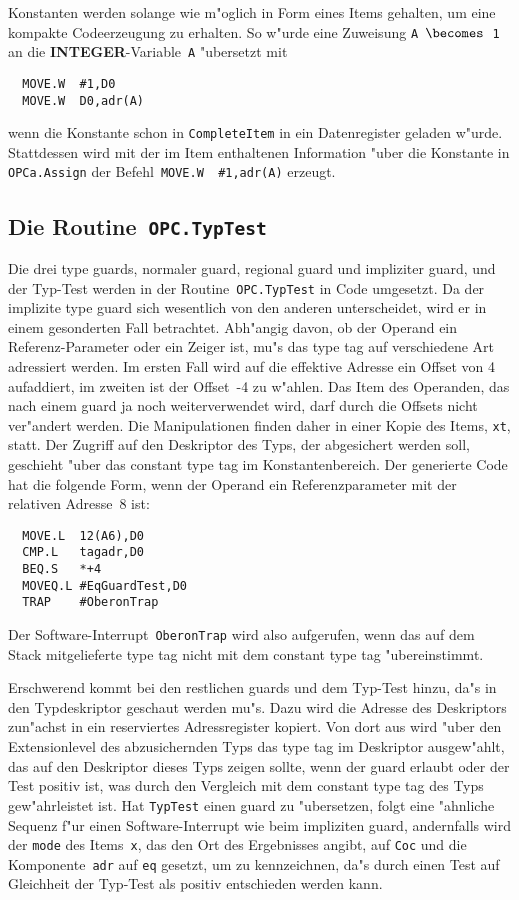 Konstanten werden solange wie m"oglich in Form eines Items gehalten,
um eine kompakte Codeerzeugung zu erhalten.
So w"urde eine Zuweisung {\tt A $\becomes$ 1} an die {\bf INTEGER}-Variable~{\tt A}
"ubersetzt mit
\newpage
\begin{verbatim}
  MOVE.W  #1,D0
  MOVE.W  D0,adr(A)
\end{verbatim}
wenn die Konstante schon in {\tt CompleteItem} in ein Datenregister geladen
w"urde.
Stattdessen wird mit der im Item enthaltenen Information "uber
die Konstante in {\tt OPCa.Assign} der Befehl~{\tt MOVE.W\ \ \#1,adr(A)}
erzeugt.

\subsection{Die Routine~{\tt OPC.TypTest}}

Die drei type guards, normaler guard, regional guard und impliziter guard,
und der Typ-Test werden in der Routine~{\tt OPC.TypTest} in Code
umgesetzt.
Da der implizite type guard sich wesentlich von den anderen unterscheidet,
wird er in einem gesonderten Fall betrachtet.
Abh"angig davon, ob der Operand ein Referenz-Parameter oder ein
Zeiger ist, mu"s das type tag auf verschiedene Art adressiert werden.
Im ersten Fall wird auf die effektive Adresse ein Offset von 4
aufaddiert, im zweiten ist der Offset~-4 zu w"ahlen.
Das Item des Operanden, das nach einem guard ja noch weiterverwendet
wird, darf durch die Offsets nicht ver"andert werden.
Die Manipulationen finden daher in einer Kopie des Items, {\tt xt},
statt.
Der Zugriff auf den Deskriptor des Typs, der abgesichert werden soll,
geschieht "uber das constant type tag im Konstantenbereich.
Der generierte Code hat die folgende Form, wenn der Operand ein
Referenzparameter mit der relativen Adresse~8 ist:
\begin{verbatim}
  MOVE.L  12(A6),D0
  CMP.L   tagadr,D0
  BEQ.S   *+4
  MOVEQ.L #EqGuardTest,D0
  TRAP    #OberonTrap
\end{verbatim}
Der Software-Interrupt~{\tt OberonTrap} wird also aufgerufen, wenn das
auf dem Stack mitgelieferte type tag nicht mit dem constant type tag
"ubereinstimmt.

Erschwerend kommt bei den restlichen guards und dem Typ-Test hinzu,
da"s in den Typdeskriptor geschaut werden mu"s.
Dazu wird die Adresse des Deskriptors zun"achst in ein reserviertes
Adressregister kopiert.
Von dort aus wird "uber den Extensionlevel des abzusichernden Typs
das type tag im Deskriptor ausgew"ahlt, das auf den Deskriptor
dieses Typs zeigen sollte, wenn der guard erlaubt oder der Test
positiv ist, was durch den Vergleich mit dem constant type tag des
Typs gew"ahrleistet ist.
Hat {\tt TypTest} einen guard zu "ubersetzen, folgt eine "ahnliche
Sequenz f"ur einen Software-Interrupt wie beim impliziten guard,
andernfalls wird der {\tt mode} des Items~{\tt x}, das den Ort des
Ergebnisses angibt, auf {\tt Coc} und die Komponente~{\tt adr} auf {\tt eq}
gesetzt, um zu kennzeichnen, da"s durch einen Test auf Gleichheit
der Typ-Test als positiv entschieden werden kann.


